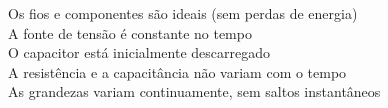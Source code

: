 \documentclass[preview]{standalone}
\begin{document}
Os fios e componentes são ideais (sem perdas de energia)\\A fonte de tensão é constante no tempo\\O capacitor está inicialmente descarregado\\A resistência e a capacitância não variam com o tempo\\As grandezas variam continuamente, sem saltos instantâneos\\
\end{document}
